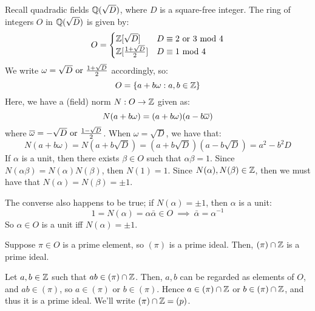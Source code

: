 Recall quadradic fields $ \mathbb{Q}(\sqrt{D}) $, where $ D $ is a square-free integer.
The ring of integers $ O $ in $ \mathbb{Q}(\sqrt{D}) $ is given by:
\begin{equation*}
    O =
    \begin{cases}
        \mathbb{Z}[\sqrt{D}] & D \equiv 2 \textrm{ or } 3 \ \mathrm{mod}\ 4 \\
        \mathbb{Z}[\frac{1+\sqrt{D}}{2}] & D \equiv 1 \ \mathrm{mod}\ 4
    \end{cases}
\end{equation*}
We write $ \omega = \sqrt{D} \textrm{ or } \frac{1+\sqrt{D}}{2} $ accordingly, so:
\begin{equation*}
    O = \left\{{a+b\omega : a,b \in \mathbb{Z}}\right\}
\end{equation*}
Here, we have a (field) norm $ N: O \rightarrow \mathbb{Z} $ given as:
\begin{equation*}
    N(a+b\omega) = (a+b\omega)(a-b\overline{\omega})
\end{equation*}
where $ \overline{\omega} = -\sqrt{D} \textrm{ or } \frac{1-\sqrt{D}}{2} $.
When $ \omega = \sqrt{D} $, we have that:
\begin{equation*}
    N(a+b\omega) = N(a+b\sqrt{D}) = (a+b\sqrt{D})(a-b\sqrt{D}) = a^{2}-b^{2}D
\end{equation*}
If $ \alpha $ is a unit, then there exists $ \beta \in O $ such that $ \alpha\beta = 1 $.
Since $ N(\alpha\beta) = N(\alpha)N(\beta) $, then $ N(1) = 1 $.
Since $ N(\alpha), N(\beta) \in \mathbb{Z} $, then we must have that $ N(\alpha) = N(\beta) = \pm1 $.

The converse also happens to be true; if $ N(\alpha) = \pm1 $, then $ \alpha $ is a unit:
\begin{equation*}
    1 = N(\alpha) = \alpha\bar{\alpha} \in O \ \implies \ \bar{\alpha} = \alpha^{-1}
\end{equation*}
So $ \alpha \in O $ is a unit iff $ N(\alpha) = \pm1 $.

\begin{thm}
    Suppose $ \pi \in O $ is a prime element, so $ (\pi) $ is a prime ideal.
    Then, $ (\pi) \cap \mathbb{Z} $ is a prime ideal.
\end{thm}

\begin{pf}[source=Primary Source Material]
    Let $ a, b \in \mathbb{Z} $ such that $ ab \in (\pi) \cap \mathbb{Z} $.
    Then, $ a, b $ can be regarded as elements of $ O $, and $ ab \in (\pi) $, so
    $ a \in (\pi) $ or $ b \in (\pi) $. Hence $ a \in (\pi) \cap \mathbb{Z} $ or
    $ b \in (\pi) \cap \mathbb{Z} $, and thus it is a prime ideal.
    We'll write $ (\pi) \cap \mathbb{Z} = (p) $.
\end{pf}

